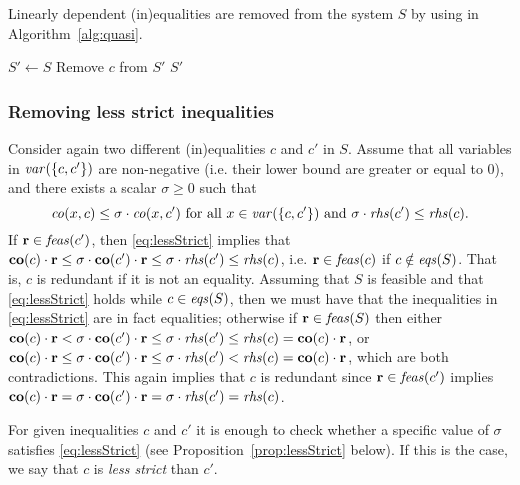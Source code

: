 Linearly dependent (in)equalities are removed from the system $S$ by using  in Algorithm~\ref{alg:quasi}.  

\begin{algorithm}\caption{Removing linearly dependent (in)equalities from an (in)equality system $S$.%
}\label{alg:quasi}
\begin{algorithmic}[1]
\State $S' \gets S$
\label{line:quasi-for}
		\label{line:quasi-if}
			\State Remove $c$ from $S'$
		\EndIf
	\EndFor
\EndFor
\State \Return $S'$
\EndFunction
\end{algorithmic}
\end{algorithm}
%
\subsubsection{Removing less strict inequalities}\label{para:lessStrict} 
	Consider again two different (in)equalities $c$ and $c'$ in $S$. 
	Assume that all variables in $\mathit{var}(\{c,c'\})$ are non-negative (i.e. their lower bound are greater or equal to $0$), and there exists a scalar $\sigma\geq 0$ such that
\begin{equation}\label{eq:lessStrict}
\mathit{co}(x,c) \leq \sigma\cdot \mathit{co}(x, c') \text{ for all } x\in\mathit{var}(\{c,c'\}) \text{ and } \sigma\cdot \mathit{rhs}(c') \leq \mathit{rhs}(c).
\end{equation}
%
If $\mathbf{r}\in \mathit{feas}(c')$, then \eqref{eq:lessStrict} implies that $\mathbf{co}(c)\cdot\mathbf{r} \leq \sigma\cdot \mathbf{co}(c')\cdot\mathbf{r} \leq \sigma\cdot \mathit{rhs}(c') \leq \mathit{rhs}(c)$, i.e. $\mathbf{r}\in\mathit{feas}(c)$ if $c\notin\mathit{eqs}(S)$. That is, $c$ is redundant if it is not an equality. 
Assuming that $S$ is feasible and that \eqref{eq:lessStrict} holds while $c\in\mathit{eqs}(S)$, then we must have that the inequalities in \eqref{eq:lessStrict} are in fact equalities; otherwise if $\mathbf{r}\in \mathit{feas}(S)$ then either 
$\mathbf{co}(c)\cdot\mathbf{r} < \sigma\cdot \mathbf{co}(c')\cdot\mathbf{r} \leq \sigma\cdot \mathit{rhs}(c') \leq \mathit{rhs}(c) = \mathbf{co}(c)\cdot\mathbf{r}$, or  $\mathbf{co}(c)\cdot\mathbf{r} \leq \sigma\cdot \mathbf{co}(c')\cdot\mathbf{r} \leq \sigma\cdot \mathit{rhs}(c') < \mathit{rhs}(c) = \mathbf{co}(c)\cdot\mathbf{r}$, which are both contradictions. This again implies that $c$ is redundant since $\mathbf{r}\in\mathit{feas}(c')$ implies  $\mathbf{co}(c)\cdot\mathbf{r} = \sigma\cdot \mathbf{co}(c')\cdot\mathbf{r} = \sigma\cdot \mathit{rhs}(c') = \mathit{rhs}(c)$.
	
For given inequalities $c$ and $c'$ it is enough to check whether a specific value of $\sigma$ satisfies \eqref{eq:lessStrict} (see Proposition~\ref{prop:lessStrict} below). If this is the case, we say that $c$ is \emph{less strict} than $c'$.

